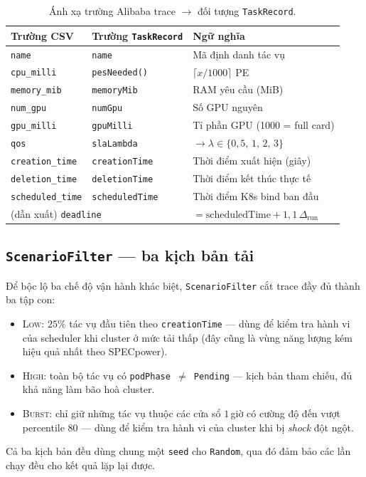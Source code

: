 \begin{table}[H]
  \centering
  \caption{Ánh xạ trường Alibaba trace $\to$ đối tượng \texttt{TaskRecord}.}
  \label{tab:trace-fields}
  \small
  \begin{tabular}{lll}
    \toprule
    \textbf{Trường CSV}      & \textbf{Trường \texttt{TaskRecord}} & \textbf{Ngữ nghĩa} \\
    \midrule
    \texttt{name}            & \texttt{name}        & Mã định danh tác vụ \\
    \texttt{cpu\_milli}      & \texttt{pesNeeded()} & $\lceil x/1000 \rceil$ PE \\
    \texttt{memory\_mib}     & \texttt{memoryMib}   & RAM yêu cầu (MiB) \\
    \texttt{num\_gpu}        & \texttt{numGpu}      & Số GPU nguyên \\
    \texttt{gpu\_milli}      & \texttt{gpuMilli}    & Tỉ phần GPU (1000 = full card) \\
    \texttt{qos}             & \texttt{slaLambda}   & $\to \lambda \in \{0{,}5,\,1,\,2,\,3\}$ \\
    \texttt{creation\_time}  & \texttt{creationTime}& Thời điểm xuất hiện (giây) \\
    \texttt{deletion\_time}  & \texttt{deletionTime}& Thời điểm kết thúc thực tế \\
    \texttt{scheduled\_time} & \texttt{scheduledTime}& Thời điểm K8s bind ban đầu \\
    \multicolumn{2}{l}{(dẫn xuất) \texttt{deadline}}& $= \mathrm{scheduledTime} + 1{,}1\,\Delta_{\mathrm{run}}$ \\
    \bottomrule
  \end{tabular}
\end{table}

\subsection{\texttt{ScenarioFilter} --- ba kịch bản tải}
\label{ssec:scenario}
Để bộc lộ ba chế độ vận hành khác biệt, \texttt{ScenarioFilter} cắt
trace đầy đủ thành ba tập con:
\begin{itemize}
  \item \textsc{Low}: $25\%$ tác vụ đầu tiên theo
        \texttt{creationTime} --- dùng để kiểm tra hành vi của
        scheduler khi cluster ở mức tải thấp (đây cũng là vùng năng
        lượng kém hiệu quả nhất theo SPECpower).
  \item \textsc{High}: toàn bộ tác vụ có
        \texttt{podPhase $\neq$ Pending} --- kịch bản tham chiếu,
        đủ khả năng làm bão hoà cluster.
  \item \textsc{Burst}: chỉ giữ những tác vụ thuộc các cửa sổ
        $1$\,giờ có cường độ đến vượt percentile $80$ --- dùng để
        kiểm tra hành vi của cluster khi bị \emph{shock} đột ngột.
\end{itemize}
Cả ba kịch bản đều dùng chung một \texttt{seed} cho \texttt{Random},
qua đó đảm bảo các lần chạy đều cho kết quả lặp lại được.

